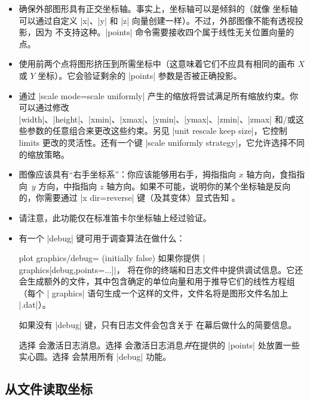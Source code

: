 {{\begin{itemize}
        算法应该能检测到任何缺陷。不过，如果你在这里遇到奇怪的“Dimension too large”消息，可以尝试 |points| 中的其他参数。查看你的日志文件，它可能会指出问题的根源（或使用 |debug| 键）。
    \item 确保外部图形具有正交坐标轴。事实上，坐标轴可以是倾斜的（就像 \PGFPlots{} 坐标轴可以通过自定义 |x|、|y| 和 |z| 向量创建一样）。不过，外部图像不能有透视投影，因为 \PGFPlots{} 不支持这种。|points| 命令需要接收四个属于线性无关位置向量的点。
    \item \PGFPlots{} 使用前两个点将图形挤压到所需坐标中（这意味着它们不应具有相同的画布 $X$ 或 $Y$ 坐标）。它会验证剩余的 |points| 参数是否被正确投影。
    \item 通过 |scale mode=scale uniformly| 产生的缩放将尝试满足所有缩放约束。你可以通过修改 |width|、|height|、|xmin|、|xmax|、|ymin|、|ymax|、|zmin|、|zmax| 和/或这些参数的任意组合来更改这些约束。另见 |unit rescale keep size|，它控制 limits 更改的灵活性。还有一个键 |scale uniformly strategy|，它允许选择不同的缩放策略。
    \item 图像应该具有“右手坐标系”：你应该能够用右手，拇指指向 $x$ 轴方向，食指指向~$y$ 方向，中指指向 $z$ 轴方向。如果不可能，说明你的某个坐标轴是反向的，你需要通过 |x dir=reverse| 键（及其变体）显式告知 \PGFPlots{}。
    \item 请注意，此功能仅在标准笛卡尔坐标轴上经过验证。
    \item 有一个 |debug| 键可用于调查算法在做什么：
        \begin{pgfplotskey}{plot graphics/debug= (initially false)}
            如果你提供 | graphics[debug,points={...}]|，\PGFPlots{} 将在你的终端和日志文件中提供调试信息。它还会生成额外的文件，其中包含确定的单位向量和用于推导它们的线性方程组（每个 | graphics| 语句生成一个这样的文件，文件名将是图形文件名加上 |.dat|）。

            如果没有 |debug| 键，只有日志文件会包含关于 \PGFPlots{} 在幕后做什么的简要信息。

            选择  会激活日志消息。选择  会激活日志消息\emph{并}在提供的 |points| 处放置一些实心圆。选择  会禁用所有 |debug| 功能。
        \end{pgfplotskey}
\end{itemize}
}


\subsection{从文件读取坐标}

}
